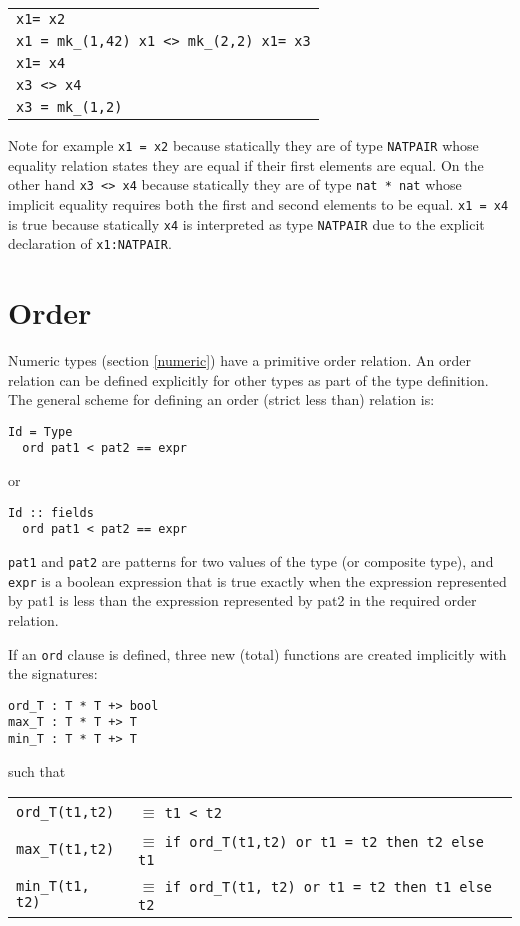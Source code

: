 \documentclass{overturerepchap}
\begin{document}
\begin{description}
\begin{tabular}{l}
{\tt x1= x2}\\
{\tt x1 = mk\_(1,42) x1 <> mk\_(2,2) x1= x3}\\
{\tt x1= x4} \\
{\tt x3 <> x4} \\
{\tt x3 = mk\_(1,2)}\\
\end{tabular}

Note for example {\tt x1 = x2} because statically they are of type {\tt NATPAIR} whose equality relation states they are equal if their first elements are equal. 
On the other hand {\tt x3 <> x4} because statically they are of type {\tt nat * nat} whose implicit equality requires both the first and second elements to be equal.
{\tt x1 = x4} is true because statically {\tt x4} is interpreted as type {\tt NATPAIR} due to the explicit declaration of {\tt x1:NATPAIR}.
\end{description}

\section{Order}\label{ord}
Numeric types (section \ref{numeric}) have a primitive order relation.
An order relation can be defined explicitly for other types as part of the type definition.
The general scheme for defining an order (strict less than) relation is:
\begin{lstlisting}
Id = Type
  ord pat1 < pat2 == expr
\end{lstlisting}
or
\begin{lstlisting}
Id :: fields
  ord pat1 < pat2 == expr
\end{lstlisting}
{\tt pat1} and {\tt pat2} are patterns for two values of the type (or composite type), and {\tt expr} is a boolean expression that is true exactly when the expression represented by pat1 is less than the expression represented by pat2 in the required order relation.

If an {\tt ord} clause is defined, three new (total) functions are created implicitly with the signatures:
\begin{lstlisting}
ord_T : T * T +> bool
max_T : T * T +> T
min_T : T * T +> T
\end{lstlisting}
         such that

\begin{tabular}{l l}
{\tt ord\_T(t1,t2)} & $\equiv$ {\tt t1 < t2} \\
{\tt max\_T(t1,t2)} & $\equiv$ {\tt if ord\_T(t1,t2) or t1 = t2 then t2 else t1}\\
{\tt min\_T(t1, t2)} & $\equiv$ {\tt if ord\_T(t1, t2) or t1 = t2 then t1 else t2}\\
\end{tabular}
\end{document}
